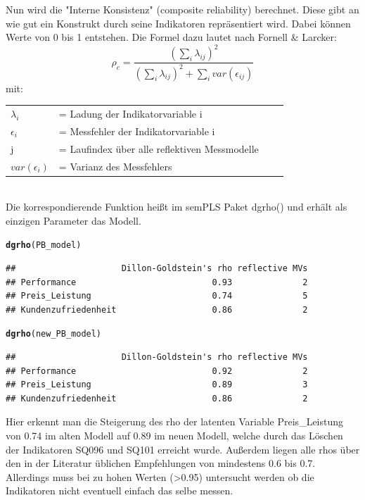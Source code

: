 \documentclass{article}\usepackage[]{graphicx}\usepackage[]{color}
\makeatletter
\newcommand{\hlstd}[1]{\textcolor[rgb]{0.345,0.345,0.345}{#1}}%
\newcommand{\hlkwd}[1]{\textcolor[rgb]{0.737,0.353,0.396}{\textbf{#1}}}%
\newenvironment{kframe}{%
 \def\at@end@of@kframe{}%
 \ifinner\ifhmode%
  \def\at@end@of@kframe{\end{minipage}}%
  \begin{minipage}{\columnwidth}%
 \fi\fi%
 \def\FrameCommand##1{\hskip\@totalleftmargin \hskip-\fboxsep
 \colorbox{shadecolor}{##1}\hskip-\fboxsep
     \hskip-\linewidth \hskip-\@totalleftmargin \hskip\columnwidth}%
 \MakeFramed {\advance\hsize-\width
   \@totalleftmargin\z@ \linewidth\hsize
   \@setminipage}}%
 {\par\unskip\endMakeFramed%
 \at@end@of@kframe}
\newenvironment{knitrout}{}{} %
\makeatother
\begin{document}
Nun wird die "Interne Konsistenz" (composite reliability) berechnet. Diese gibt an wie gut ein Konstrukt durch seine Indikatoren repräsentiert wird. Dabei können Werte von 0 bis 1 entstehen. Die Formel dazu lautet nach Fornell \& Larcker:\cite{fornell1981structural}
\begin{equation}
\rho_{c} = \frac{(\sum_{i}^{}\lambda_{ij})^{2}}{(\sum_{i}^{}\lambda_{ij})^{2}+\sum_{i}^{}var(\epsilon_{ij})}
\end{equation}
mit:\\
\begin{tabular}{llll}
$\lambda_{i}$  &= Ladung der Indikatorvariable i\\
$\epsilon_{i}$ &= Messfehler der Indikatorvariable i\\
j  &= Laufindex über alle reflektiven Messmodelle\\
$var(\epsilon_{i})$ &= Varianz des Messfehlers\\
\end{tabular}
\\
Die korrespondierende Funktion heißt im semPLS Paket dgrho() und erhält als einzigen Parameter das Modell.
\begin{knitrout}
\color{fgcolor}\begin{kframe}
\begin{alltt}
\hlkwd{dgrho}\hlstd{(PB_model)}
\end{alltt}
\begin{verbatim}
##                     Dillon-Goldstein's rho reflective MVs
## Performance                           0.93              2
## Preis_Leistung                        0.74              5
## Kundenzufriedenheit                   0.86              2
\end{verbatim}
\begin{alltt}
\hlkwd{dgrho}\hlstd{(new_PB_model)}
\end{alltt}
\begin{verbatim}
##                     Dillon-Goldstein's rho reflective MVs
## Performance                           0.92              2
## Preis_Leistung                        0.89              3
## Kundenzufriedenheit                   0.86              2
\end{verbatim}
\end{kframe}
\end{knitrout}
Hier erkennt man die Steigerung des rho der latenten Variable Preis\_Leistung von 0.74 im alten Modell auf 0.89 im neuen Modell, welche durch das Löschen der Indikatoren SQ096 und SQ101 erreicht wurde. Außerdem liegen alle rhos über den in der Literatur üblichen Empfehlungen von mindestens 0.6 bis 0.7.\cite{nunnally1978c,bagozzi1988evaluation} Allerdings muss bei zu hohen Werten (>0.95) untersucht werden ob die Indikatoren nicht eventuell einfach das selbe messen.
\end{document}
